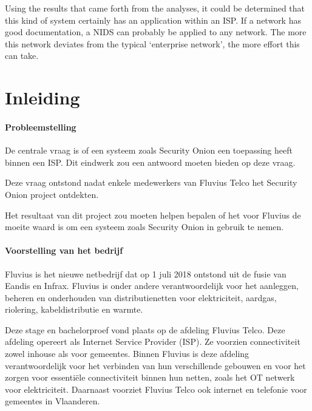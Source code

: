 \documentclass[a4paper,12pt]{report}
\begin{document}
Using the results that came forth from the analyses, it could be determined that this kind of system certainly has an application within an ISP.
If a network has good documentation, a NIDS can probably be applied to any network.
The more this network deviates from the typical `enterprise network', the more effort this can take.

\newpage

\tableofcontents
\newpage

\listoffigures

\chapter*{Inleiding}
\subsubsection{Probleemstelling}
De centrale vraag is of een systeem zoals Security Onion een toepassing heeft binnen een ISP.
Dit eindwerk zou een antwoord moeten bieden op deze vraag.

Deze vraag ontstond nadat enkele medewerkers van Fluvius Telco het Security Onion project ontdekten.

Het resultaat van dit project zou moeten helpen bepalen of het voor Fluvius de moeite waard is om een systeem zoals Security Onion in gebruik te nemen.

\subsubsection{Voorstelling van het bedrijf}
Fluvius is het nieuwe netbedrijf dat op 1 juli 2018 ontstond uit de fusie van Eandis en Infrax.
Fluvius is onder andere verantwoordelijk voor het aanleggen, beheren en onderhouden van distributienetten voor elektriciteit, aardgas, riolering, kabeldistributie en warmte.

Deze stage en bachelorproef vond plaats op de afdeling Fluvius Telco.
Deze afdeling opereert als Internet Service Provider (ISP).
Ze voorzien connectiviteit zowel inhouse als voor gemeentes.
Binnen Fluvius is deze afdeling verantwoordelijk voor het verbinden van hun verschillende gebouwen en voor het zorgen voor essentiële connectiviteit binnen hun netten, zoals het OT netwerk voor elektriciteit.
Daarnaast voorziet Fluvius Telco ook internet en telefonie voor gemeentes in Vlaanderen.
\end{document}
